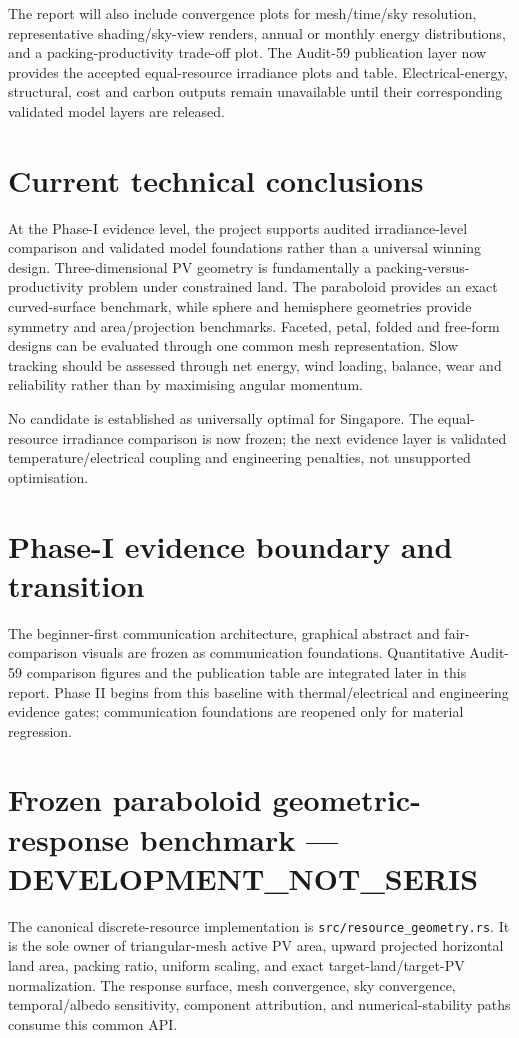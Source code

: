 \documentclass[11pt,a4paper]{article}
\begin{document}
The report will also include convergence plots for mesh/time/sky resolution, representative shading/sky-view renders, annual or monthly energy distributions, and a packing-productivity trade-off plot. The Audit-59 publication layer now provides the accepted equal-resource irradiance plots and table. Electrical-energy, structural, cost and carbon outputs remain unavailable until their corresponding validated model layers are released.

\section{Current technical conclusions}
At the Phase-I evidence level, the project supports audited irradiance-level comparison and validated model foundations rather than a universal winning design. Three-dimensional PV geometry is fundamentally a packing-versus-productivity problem under constrained land. The paraboloid provides an exact curved-surface benchmark, while sphere and hemisphere geometries provide symmetry and area/projection benchmarks. Faceted, petal, folded and free-form designs can be evaluated through one common mesh representation. Slow tracking should be assessed through net energy, wind loading, balance, wear and reliability rather than by maximising angular momentum.

No candidate is established as universally optimal for Singapore. The equal-resource irradiance comparison is now frozen; the next evidence layer is validated temperature/electrical coupling and engineering penalties, not unsupported optimisation.

\section{Phase-I evidence boundary and transition}
The beginner-first communication architecture, graphical abstract and fair-comparison visuals are frozen as communication foundations. Quantitative Audit-59 comparison figures and the publication table are integrated later in this report. Phase II begins from this baseline with thermal/electrical and engineering evidence gates; communication foundations are reopened only for material regression.



\section{Frozen paraboloid geometric-response benchmark --- DEVELOPMENT\_NOT\_SERIS}
The canonical discrete-resource implementation is \texttt{src/resource\_geometry.rs}. It is the sole owner of triangular-mesh active PV area, upward projected horizontal land area, packing ratio, uniform scaling, and exact target-land/target-PV normalization. The response surface, mesh convergence, sky convergence, temporal/albedo sensitivity, component attribution, and numerical-stability paths consume this common API.
\end{document}
